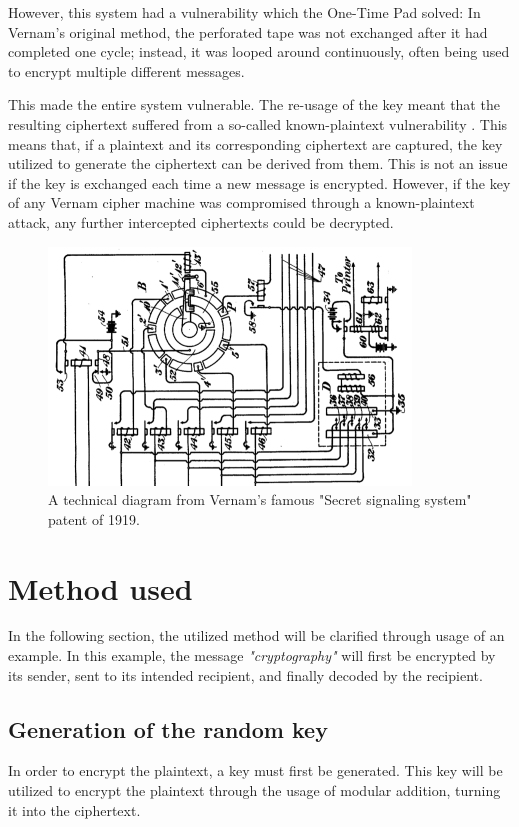 \documentclass[12pt]{report}
\begin{document}
However, this system had a vulnerability which the One-Time Pad solved: In Vernam's original method, the perforated tape was not exchanged after it had completed one cycle; instead, it was looped around continuously, often being used to encrypt multiple different messages.

This made the entire system vulnerable. The re-usage of the key meant that the resulting ciphertext suffered from a so-called known-plaintext vulnerability \cite{HutSix}. This means that, if a plaintext and its corresponding ciphertext are captured, the key utilized to generate the ciphertext can be derived from them. This is not an issue if the key is exchanged each time a new message is encrypted. However, if the key of any Vernam cipher machine was compromised through a known-plaintext attack, any further intercepted ciphertexts could be decrypted.

\begin{figure}[H]
\centering
\includegraphics[scale=1]{VernamCipher.jpg}
\caption{A technical diagram from Vernam's famous "Secret signaling system" patent of 1919.}
\end{figure}    

\section{Method used}
In the following section, the utilized method will be clarified through usage of an example. In this example, the message \textit{"cryptography"} will first be encrypted by its sender, sent to its intended recipient, and finally decoded by the recipient.

\subsection{Generation of the random key}
In order to encrypt the plaintext, a key must first be generated. This key will be utilized to encrypt the plaintext through the usage of modular addition, turning it into the ciphertext.
\end{document}
